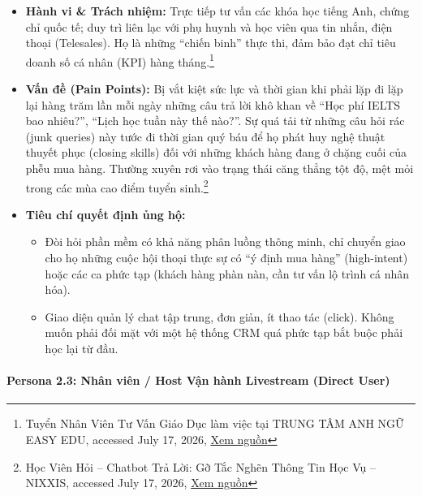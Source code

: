 \begin{itemize}
    \item \textbf{Hành vi \& Trách nhiệm:} Trực tiếp tư vấn các khóa học tiếng Anh, chứng chỉ quốc tế; duy trì liên lạc với phụ huynh và học viên qua tin nhắn, điện thoại (Telesales). Họ là những ``chiến binh'' thực thi, đảm bảo đạt chỉ tiêu doanh số cá nhân (KPI) hàng tháng.\footnote{Tuyển Nhân Viên Tư Vấn Giáo Dục làm việc tại TRUNG TÂM ANH NGỮ EASY EDU, accessed July 17, 2026, \href{https://www.topcv.vn/viec-lam/nhan-vien-tu-van-giao-duc/1562009.html}{Xem nguồn}}

    \item \textbf{Vấn đề (Pain Points):} Bị vắt kiệt sức lực và thời gian khi phải lặp đi lặp lại hàng trăm lần mỗi ngày những câu trả lời khô khan về ``Học phí IELTS bao nhiêu?'', ``Lịch học tuần này thế nào?''. Sự quá tải từ những câu hỏi rác (junk queries) này tước đi thời gian quý báu để họ phát huy nghệ thuật thuyết phục (closing skills) đối với những khách hàng đang ở chặng cuối của phễu mua hàng. Thường xuyên rơi vào trạng thái căng thẳng tột độ, mệt mỏi trong các mùa cao điểm tuyển sinh.\footnote{Học Viên Hỏi -- Chatbot Trả Lời: Gỡ Tắc Nghẽn Thông Tin Học Vụ -- NIXXIS, accessed July 17, 2026, \href{https://nixxis.vn/chatbot-tu-van-hoc-vu-cho-hoc-vien/}{Xem nguồn}}

    \item \textbf{Tiêu chí quyết định ủng hộ:}
    \begin{itemize}
        \item Đòi hỏi phần mềm có khả năng phân luồng thông minh, chỉ chuyển giao cho họ những cuộc hội thoại thực sự có ``ý định mua hàng'' (high-intent) hoặc các ca phức tạp (khách hàng phàn nàn, cần tư vấn lộ trình cá nhân hóa).

        \item Giao diện quản lý chat tập trung, đơn giản, ít thao tác (click). Không muốn phải đối mặt với một hệ thống CRM quá phức tạp bắt buộc phải học lại từ đầu.
    \end{itemize}
\end{itemize}

\paragraph{Persona 2.3: Nhân viên / Host Vận hành Livestream (Direct User)}

